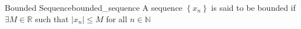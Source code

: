 \begin{definition}{Bounded Sequence}{bounded_sequence}
A sequence $ \left\{ x _{ n }  \right\}  $ is said to be bounded if $ \exists M \in \mathbb{R}   $ such that $ \left| x _{ n }  \right| \le M $ for all $ n \in  \mathbb{N}  $ 
\end{definition}
